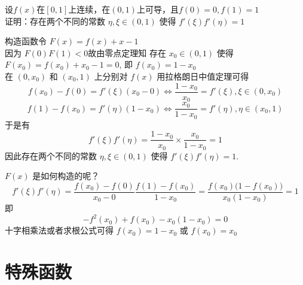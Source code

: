 \documentclass[color=green,titlestyle=hang]{elegantbook}%
\begin{document}
\begin{example}
设$f(x)$在$[0,1]$上连续，在$(0,1)$上可导，且$f(0)=0,f(1)=1$\,\\
证明：存在两个不同的常数 $\eta,\xi\in(0,1)$ 使得 $f'(\xi)f'(\eta)=1$
\end{example}\begin{solution}
构造函数令 $F(x)=f(x)+x-1$\\
因为 $F(0)F(1)<0$故由零点定理知 存在 $x_0\in(0,1)$ 使得 $F(x_0)=f(x_0)+x_0-1=0$, 即 $f(x_0)=1-x_0$\\
在 $(0,x_0)$ 和 $(x_0,1)$ 上分别对 $f(x)$ 用拉格朗日中值定理可得
\[f(x_0)-f(0)=f'(\xi)(x_0-0)\Leftrightarrow \frac{1-x_0}{x_0}=f'(\xi),\xi\in(0,x_0)\]
\[f(1)-f(x_0)=f'(\eta)(1-x_0)\Leftrightarrow \frac{x_0}{1-x_0}=f'(\eta),\eta\in(x_0,1)\]
于是有
\[f'(\xi)f'(\eta)=\frac{1-x_0}{x_0}\times\frac{x_0}{1-x_0}=1\]
因此存在两个不同的常数 $\eta,\xi\in(0,1)$ 使得 $f'(\xi)f'(\eta)=1$. 
\end{solution}
\begin{remark}
$F(x)$ 是如何构造的呢？%
\[f'(\xi)f'(\eta)
=\frac{f(x_0)-f(0)}{x_0-0}\frac{f(1)-f(x_0)}{1-x_0}=\frac{f(x_0)\big(1-f(x_0)\big)}{x_0(1-x_0)}=1\]
即
\[-f^2(x_0)+f(x_0)-x_0(1-x_0)=0\]
十字相乘法或者求根公式可得 $f(x_0)=1-x_0$ 或 $f(x_0)=x_0$
\end{remark}

\chapter{特殊函数}

%
\end{document}
